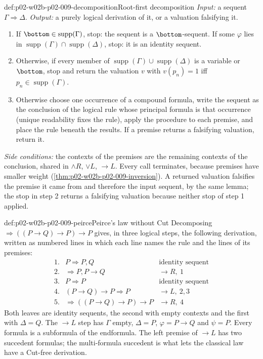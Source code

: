 \begin{hbmethod}{def:p02-w02b-p02-009-decomposition}{Root-first decomposition}
\emph{Input:} a sequent \(\Gamma\Rightarrow\Delta\).  \emph{Output:} a purely
logical derivation of it, or a valuation falsifying it.
\begin{enumerate}
  \item If \(\bottom\in\operatorname{supp}(\Gamma)\), stop: the sequent is a
    \(\bottom\)-sequent.  If some \(\varphi\) lies in
    \(\operatorname{supp}(\Gamma)\cap\operatorname{supp}(\Delta)\), stop: it
    is an identity sequent.
  \item Otherwise, if every member of
    \(\operatorname{supp}(\Gamma)\cup\operatorname{supp}(\Delta)\) is a
    variable or \(\bottom\), stop and return the valuation \(v\) with
    \(v(p_n)=1\) iff \(p_n\in\operatorname{supp}(\Gamma)\).
  \item Otherwise choose one occurrence of a compound formula, write the
    sequent as the conclusion of the logical rule whose principal formula is
    that occurrence (unique readability fixes the rule), apply the procedure
    to each premise, and place the rule beneath the results.  If a premise
    returns a falsifying valuation, return it.
\end{enumerate}
\emph{Side conditions:} the contexts of the premises are the remaining
contexts of the conclusion, shared in \(\land R\), \(\lor L\), \(\to L\).
Every call terminates, because premises have smaller weight
(\cref{thm:p02-w02b-p02-009-inversion}).  A returned valuation falsifies the
premise it came from and therefore the input sequent, by the same lemma;
the stop in step 2 returns a falsifying valuation because neither stop of
step 1 applied.
\end{hbmethod}

\begin{hbexample}{def:p02-w02b-p02-009-peirce}{Peirce's law without Cut}
Decomposing \({}\Rightarrow((P\to Q)\to P)\to P\) gives, in three logical
steps, the following derivation, written as numbered lines in which each
line names the rule and the lines of its premises:
\[
\begin{array}{rll}
1.&P\Rightarrow P,Q&\text{identity sequent}\\
2.&{}\Rightarrow P,P\to Q&\to R,\ 1\\
3.&P\Rightarrow P&\text{identity sequent}\\
4.&(P\to Q)\to P\Rightarrow P&\to L,\ 2,3\\
5.&{}\Rightarrow((P\to Q)\to P)\to P&\to R,\ 4
\end{array}
\]
Both leaves are identity sequents, the second with empty contexts and the
first with \(\Delta=Q\).  The \(\to L\) step has \(\Gamma\) empty,
\(\Delta=P\), \(\varphi=P\to Q\) and \(\psi=P\).  Every formula is a
subformula of the endformula.  The left premise of \(\to L\) has two
succedent formulas; the multi-formula succedent is what lets the classical
law have a Cut-free derivation.
\end{hbexample}

